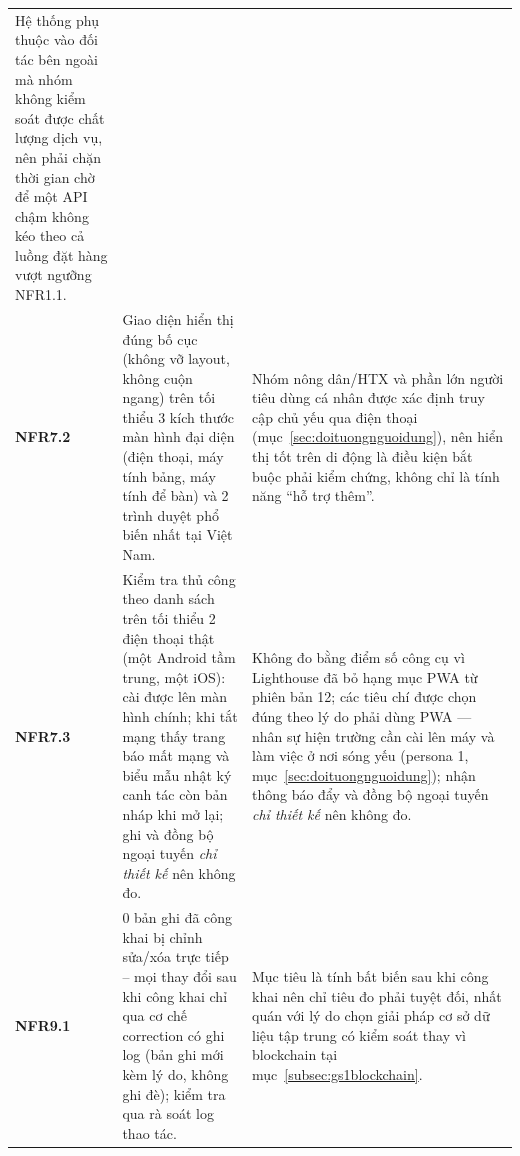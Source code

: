 \begin{longtable}{L{1.67cm} L{6.67cm} L{6.56cm}}
Hệ thống phụ thuộc vào đối tác bên ngoài mà nhóm không kiểm soát được chất lượng dịch vụ, nên phải chặn thời gian chờ để một API chậm không kéo theo cả luồng đặt hàng vượt ngưỡng NFR1.1. \\
\textbf{NFR7.2} &
Giao diện hiển thị đúng bố cục (không vỡ layout, không cuộn ngang) trên tối thiểu 3 kích thước màn hình đại diện (điện thoại, máy tính bảng, máy tính để bàn) và 2 trình duyệt phổ biến nhất tại Việt Nam. &
Nhóm nông dân/HTX và phần lớn người tiêu dùng cá nhân được xác định truy cập chủ yếu qua điện thoại (mục~\ref{sec:doituongnguoidung}), nên hiển thị tốt trên di động là điều kiện bắt buộc phải kiểm chứng, không chỉ là tính năng ``hỗ trợ thêm''. \\
\textbf{NFR7.3} &
Kiểm tra thủ công theo danh sách trên tối thiểu 2 điện thoại thật (một Android tầm trung, một iOS): cài được lên màn hình chính; khi tắt mạng thấy trang báo mất mạng và biểu mẫu nhật ký canh tác còn bản nháp khi mở lại; ghi và đồng bộ ngoại tuyến \emph{chỉ thiết kế} nên không đo. &
Không đo bằng điểm số công cụ vì Lighthouse đã bỏ hạng mục PWA từ phiên bản 12; các tiêu chí được chọn đúng theo lý do phải dùng PWA --- nhân sự hiện trường cần cài lên máy và làm việc ở nơi sóng yếu (persona 1, mục~\ref{sec:doituongnguoidung}); nhận thông báo đẩy và đồng bộ ngoại tuyến \emph{chỉ thiết kế} nên không đo. \\
\textbf{NFR9.1} &
0 bản ghi đã công khai bị chỉnh sửa/xóa trực tiếp -- mọi thay đổi sau khi công khai chỉ qua cơ chế correction có ghi log (bản ghi mới kèm lý do, không ghi đè); kiểm tra qua rà soát log thao tác. &
Mục tiêu là tính bất biến sau khi công khai nên chỉ tiêu đo phải tuyệt đối, nhất quán với lý do chọn giải pháp cơ sở dữ liệu tập trung có kiểm soát thay vì blockchain tại mục~\ref{subsec:gs1blockchain}. \\
\end{longtable}
\endgroup

